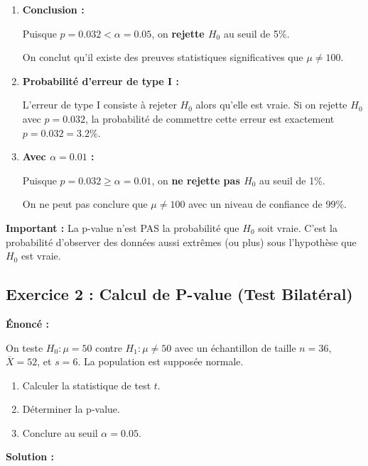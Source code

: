 \documentclass[11pt,a4paper]{article}
\begin{document}
\begin{enumerate}
    \item \textbf{Conclusion :}
    
    Puisque $p = 0.032 < \alpha = 0.05$, on \textbf{rejette $H_0$} au seuil de 5\%. 
    
    On conclut qu'il existe des preuves statistiques significatives que $\mu \neq 100$.
    
    \item \textbf{Probabilité d'erreur de type I :}
    
    L'erreur de type I consiste à rejeter $H_0$ alors qu'elle est vraie. Si on rejette $H_0$ avec $p = 0.032$, la probabilité de commettre cette erreur est exactement $p = 0.032 = 3.2\%$.
    
    \item \textbf{Avec $\alpha = 0.01$ :}
    
    Puisque $p = 0.032 \geq \alpha = 0.01$, on \textbf{ne rejette pas $H_0$} au seuil de 1\%.
    
    On ne peut pas conclure que $\mu \neq 100$ avec un niveau de confiance de 99\%.
\end{enumerate}

\begin{astucebox}
\textbf{Important :} La p-value n'est PAS la probabilité que $H_0$ soit vraie. C'est la probabilité d'observer des données aussi extrêmes (ou plus) sous l'hypothèse que $H_0$ est vraie.
\end{astucebox}

\subsection{Exercice 2 : Calcul de P-value (Test Bilatéral)}

\textbf{Énoncé :}

On teste $H_0 : \mu = 50$ contre $H_1 : \mu \neq 50$ avec un échantillon de taille $n = 36$, $\overline{X} = 52$, et $s = 6$. La population est supposée normale.

\begin{enumerate}
    \item Calculer la statistique de test $t$.
    \item Déterminer la p-value.
    \item Conclure au seuil $\alpha = 0.05$.
\end{enumerate}

\textbf{Solution :}
\end{document}
